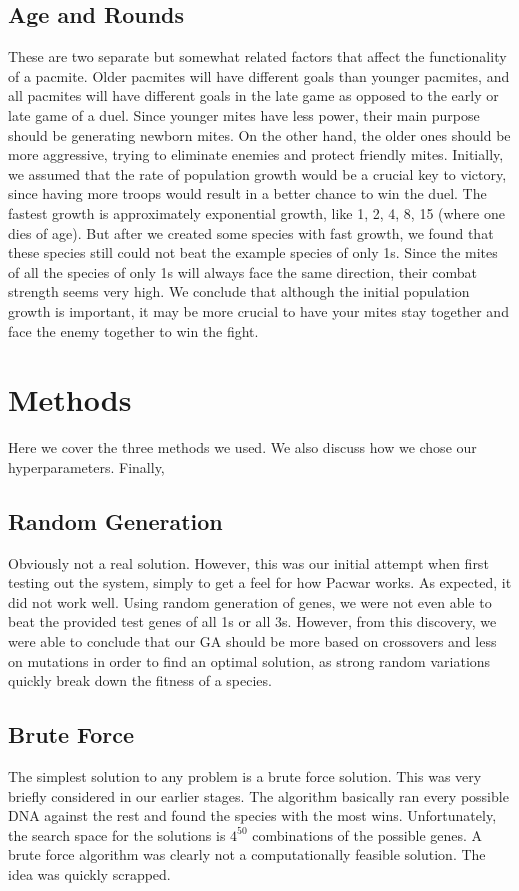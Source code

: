 \documentclass[twoside]{article}
\begin{document}
\begin{multicols}{2}
\subsection{Age and Rounds}
These are two separate but somewhat related factors that affect the functionality of a pacmite. Older pacmites will have different goals than younger pacmites, and all pacmites will have different goals in the late game as opposed to the early or late game of a duel. Since younger mites have less power, their main purpose should be generating newborn mites. On the other hand, the older ones should be more aggressive, trying to eliminate enemies and protect friendly mites. 
\indent Initially, we assumed that the rate of population growth would be a crucial key to victory, since having more troops would result in a better chance to win the duel. The fastest growth is approximately exponential growth, like 1, 2, 4, 8, 15 (where one dies of age). But after we created some species with fast growth, we found that these species still could not beat the example species of only 1s. Since the mites of all the species of only 1s will always face the same direction, their combat strength seems very high. We conclude that although the initial population growth is important, it may be more crucial to have your mites stay together and face the enemy together to win the fight.


\section{Methods}
Here we cover the three methods we used. We also discuss how we chose our hyperparameters. Finally, 

\subsection{Random Generation}
Obviously not a real solution. However, this was our initial attempt when first testing out the system, simply to get a feel for how Pacwar works. As expected, it did not work well. Using random generation of genes, we were not even able to beat the provided test genes of all 1s or all 3s. However, from this discovery, we were able to conclude that our GA should be more based on crossovers and less on mutations in order to find an optimal solution, as strong random variations quickly break down the fitness of a species. 
\subsection{Brute Force}
The simplest solution to any problem is a brute force solution. This was very briefly considered in our earlier stages. The algorithm basically ran every possible DNA against the rest and found the species with the most wins. Unfortunately, the search space for the solutions is $4^{50}$ combinations of the possible genes. A brute force algorithm was clearly not a computationally feasible solution. The idea was quickly scrapped.

\end{multicols}
\end{document}

